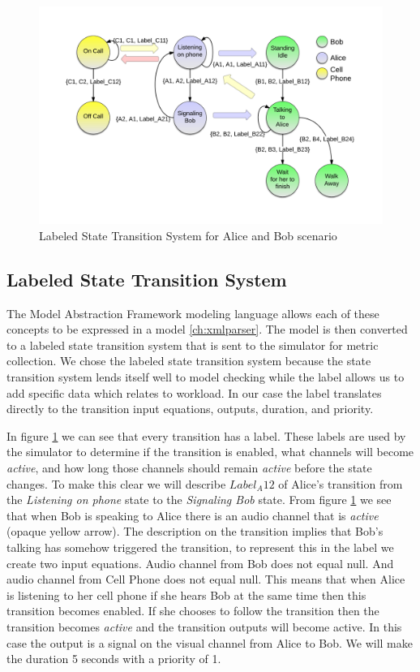 \begin{figure}[h]
\begin{center}
\includegraphics[width=\textwidth]{ab_lsts.png}
\caption{Labeled State Transition System for Alice and Bob scenario}
\label{fig:ab_lsts}
\end{center}
\end{figure}

\subsection{Labeled State Transition System}
The Model Abstraction Framework modeling language allows each of these concepts to be expressed in a model \ref{ch:xmlparser}.  The model is then converted to a labeled state transition system that is sent to the simulator for metric collection.  We chose the labeled state transition system because the state transition system lends itself well to model checking while the label allows us to add specific data which relates to workload.  In our case the label translates directly to the transition input equations, outputs, duration, and priority.

In figure \ref{fig:ab_lsts} we can see that every transition has a label.  These labels are used by the simulator to determine if the transition is enabled, what channels will become {\em active}, and how long those channels should remain {\em active} before the state changes.  To make this clear we will describe $Label_A12$ of Alice's transition from the {\em Listening on phone} state to the {\em Signaling Bob} state.  From figure \ref{fig:ab_lsts} we see that when Bob is speaking to Alice there is an audio channel that is {\em active} (opaque yellow arrow).  The description on the transition implies that Bob's talking has somehow triggered the transition, to represent this in the label we create two input equations.  Audio channel from Bob does not equal null.  And audio channel from Cell Phone does not equal null.  This means that when Alice is listening to her cell phone if she hears Bob at the same time then this transition becomes enabled.  If she chooses to follow the transition then the transition becomes {\em active} and the transition outputs will become active.  In this case the output is a signal on the visual channel from Alice to Bob.  We will make the duration 5 seconds with a priority of 1.  

